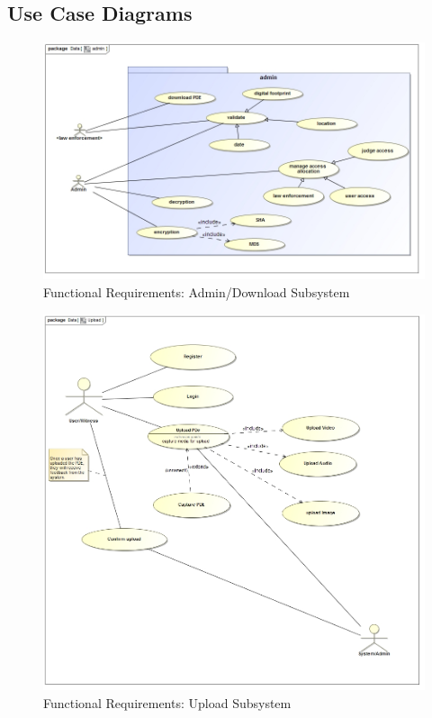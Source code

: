 \documentclass[a4paper,12pt]{article}
\begin{document}
\subsection{Use Case Diagrams}

\begin{figure}[H]
\includegraphics[width=1.0\textwidth]{images/admin.jpg}
\caption{Functional Requirements: Admin/Download Subsystem \label{overflow}}
\end{figure}

\begin{figure}[H]
\includegraphics[width=1.0\textwidth]{images/upload.jpg}
\caption{Functional Requirements: Upload Subsystem \label{overflow}}
\end{figure}
\end{document}
